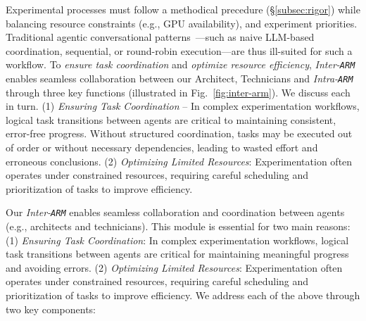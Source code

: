 
Experimental processes must follow a methodical precedure (\S\ref{subsec:rigor}) while balancing resource constraints (e.g., GPU availability), and experiment priorities.
Traditional agentic conversational patterns~\cite{autogen-conv-patterns}—such as naive LLM-based coordination, sequential, or round-robin execution—are thus ill-suited for such a workflow. 
To \textit{ensure task coordination} and \textit{optimize resource efficiency}, \textit{Inter-\texttt{ARM}} enables seamless collaboration between our Architect, Technicians and \textit{Intra-\texttt{ARM}} 
through three key functions (illustrated in Fig.~\ref{fig:inter-arm}). We discuss each in turn. 
(1) \textit{Ensuring Task Coordination} – In complex experimentation workflows, logical task transitions between agents are critical to maintaining consistent, error-free progress. Without structured coordination, tasks may be executed out of order or without necessary dependencies, leading to wasted effort and erroneous conclusions.
(2) \textit{Optimizing Limited Resources}: Experimentation often operates under constrained resources, requiring careful scheduling and prioritization of tasks to improve efficiency.
\fi

Our \textit{Inter-\texttt{ARM}} enables seamless collaboration and coordination between agents (e.g., architects and technicians).
This module is essential for two main reasons:
(1) \textit{Ensuring Task Coordination}: In complex experimentation workflows, logical task transitions between agents are critical for maintaining meaningful progress and avoiding errors.
(2) \textit{Optimizing Limited Resources}: Experimentation often operates under constrained resources, requiring careful scheduling and prioritization of tasks to improve efficiency.
We address each of the above through two key components:
\fi

